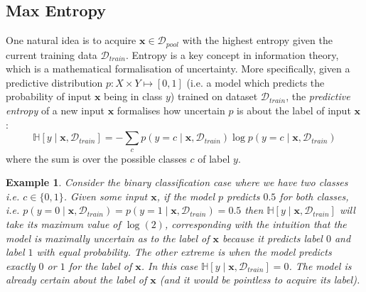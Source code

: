 \documentclass[11pt, a4paper, bibliography=totoc]{report}
\newcommand{\data}{\mathcal{D}}
\newcommand{\entropy}[1]{\mathbb{H} \left[ #1 \right] }
\newcommand{\x}{\mathbf{x}}
\newtheorem{example}{Example}
\begin{document}
\subsection{Max Entropy} \label{sec:max_ent}
One natural idea is to acquire $ \x \in \data_{pool} $ with the highest entropy \cite{shannon1948mathematical} given the current training data $ \data_{train} $. Entropy is a key concept in information theory, which is a mathematical formalisation of uncertainty. More specifically, given a predictive distribution $ p : X \times Y \mapsto [0,1] $ (i.e. a model which predicts the probability of input $ \x $ being in class $ y $) trained on dataset $ \data_{train} $, the \textit{predictive entropy} of a new input $ \x $ formalises how uncertain $ p $ is about the label of input $ \x $ \cite[p.~52]{Gal2017a}:
\begin{equation}\label{eq:entropy}
\entropy{y \mid \x, \data_{train}} = -\sum_{c} p(y=c \mid \x, \data_{train} ) \log p(y=c \mid \x, \data_{train} )
\end{equation} %
where the sum is over the possible classes $ c $ of label $ y $.

\begin{example} \label{ex:max_ent}
	Consider the binary classification case where we have two classes i.e. $ c \in \{0, 1\} $. Given some input $ \x $, if the model $ p $ predicts $ 0.5 $ for both classes, i.e. $ p(y=0 \mid \x, \data_{train}) = p(y=1 \mid \x, \data_{train}) = 0.5 $ then $ \entropy{y \mid \x, \data_{train}} $ will take its maximum value of $ \log(2) $, corresponding with the intuition that the model is maximally uncertain as to the label of $ \x $ because it predicts label $ 0 $ and label $ 1 $ with equal probability. The other extreme is when the model predicts exactly $ 0 $ or $ 1 $ for the label of $ \x $. In this case $ \entropy{y \mid \x, \data_{train}} = 0 $. The model is already certain about the label of $ \x $ (and it would be pointless to acquire its label).
\end{example}
\end{document}
